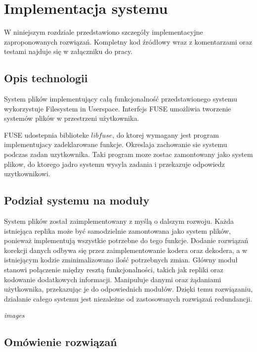 \chapter{Implementacja systemu}
\thispagestyle{chapterBeginStyle}
W niniejszym rozdziale przedstawiono szczegóły implementacyjne zaproponowanych rozwiązań. Kompletny kod źródłowy wraz z komentarzami oraz testami najduje się w załączniku do pracy.

\section{Opis technologii}

System plików implementujący całą funkcjonalność przedstawionego systemu wykorzystuje Filesystem in Userspace. Interfejs FUSE umożliwia tworzenie systemów plików w przestrzeni użytkownika. 

FUSE udostepnia biblioteke $libfuse$, do ktorej wymagany jest program implementujacy zadeklarowane funkcje. Okreslaja zachowanie sie systemu podczas zadan uzytkownika. Taki program moze zostac zamontowany jako system plikow, do ktorego jadro systemu wysyla zadania i przekazuje odpowiedz uzytkownikowi.

\section{Podział systemu na moduły}
System plików został zaimplementowany z myślą o dalszym rozwoju. Każda istniejąca replika może być samodzielnie zamontowana jako system plików, ponieważ implementują wszystkie potrzebne do tego funkcje. Dodanie rozwiązań korekcji danych odbywa się przez zaimplementowanie kodera oraz dekodera, a w istniejącym kodzie zminimalizowano ilość potrzebnych zmian. Główny moduł stanowi połączenie między resztą funkcjonalności, takich jak repliki oraz kodowanie dodatkowych informacji. Manipuluje danymi oraz żądaniami użytkownika, przekazując je do odpowiednich modułów. Dzięki temu rozwiązaniu, działanie całego systemu jest niezależne od zastosowanych rozwiązań redundancji.

\textit{images}

\section{Omówienie rozwiązań}

